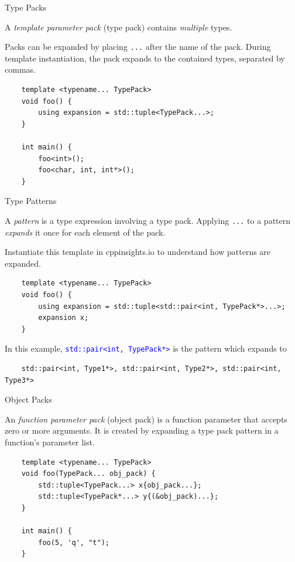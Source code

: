 \begin{frame}[fragile]{Type Packs}
  \begin{sqt:definition}
    A \emph{template parameter pack} (type pack) contains \emph{multiple} types.
  \end{sqt:definition}

  \begin{sqt:result}
    Packs can be expanded by placing \verb|...| after the name of the pack.
    During template instantiation, the pack expands to the contained types, separated by commas.
  \end{sqt:result}

  \begin{verbatim}
    template <typename... TypePack>
    void foo() {
        using expansion = std::tuple<TypePack...>;
    }

    int main() {
        foo<int>();
        foo<char, int, int*>();
    }
  \end{verbatim}
\end{frame}

\begin{frame}[fragile]{Type Patterns}
  \begin{sqt:definition}
    A \emph{pattern} is a type expression involving a type pack.
    Applying \texttt{...} to a pattern \emph{expands} it once for each element of the pack.
  \end{sqt:definition}

  Instantiate this template in cppinsights.io to understand how patterns are expanded.
  \begin{verbatim}
    template <typename... TypePack>
    void foo() {
        using expansion = std::tuple<std::pair<int, TypePack*>...>;
        expansion x;
    }
  \end{verbatim}

  In this example, \textcolor{blue}{\texttt{std::pair<int, TypePack*>}} is the pattern which expands to
  \begin{verbatim}
    std::pair<int, Type1*>, std::pair<int, Type2*>, std::pair<int, Type3*>
  \end{verbatim}
\end{frame}

\begin{frame}[fragile]{Object Packs}
  \begin{sqt:definition}
    An \emph{function parameter pack} (object pack) is a function parameter that accepts
    zero or more arguments. It is created by expanding a type pack pattern
    in a function's parameter list.
  \end{sqt:definition}

  \begin{verbatim}
    template <typename... TypePack>
    void foo(TypePack... obj_pack) {
        std::tuple<TypePack...> x{obj_pack...};
        std::tuple<TypePack*...> y{(&obj_pack)...};
    }

    int main() {
        foo(5, 'q', "t");
    }
  \end{verbatim}
\end{frame}


